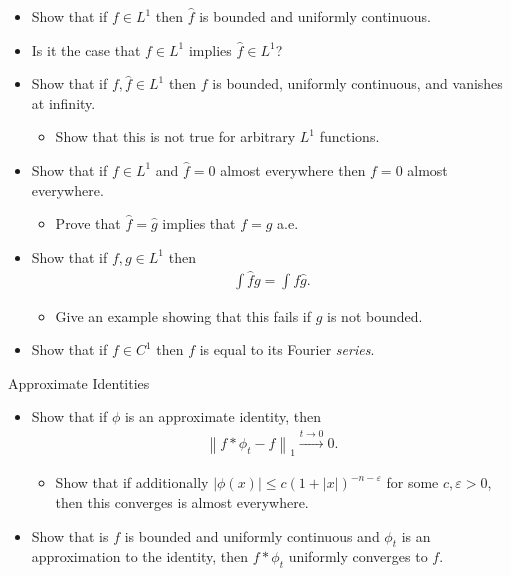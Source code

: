 \begin{itemize}
\tightlist
\item
  Show that if \(f\in L^1\) then \(\widehat{f}\) is bounded and
  uniformly continuous.
\item
  Is it the case that \(f\in L^1\) implies \(\widehat{f}\in L^1\)?
\item
  Show that if \(f, \widehat{f} \in L^1\) then \(f\) is bounded,
  uniformly continuous, and vanishes at infinity.

  \begin{itemize}
  \tightlist
  \item
    Show that this is not true for arbitrary \(L^1\) functions.
  \end{itemize}
\item
  Show that if \(f\in L^1\) and \(\widehat{f} = 0\) almost everywhere
  then \(f = 0\) almost everywhere.

  \begin{itemize}
  \tightlist
  \item
    Prove that \(\widehat{f} = \widehat{g}\) implies that \(f=g\) a.e.
  \end{itemize}
\item
  Show that if \(f, g \in L^1\) then
  \begin{align*}\int \widehat{f} g = \int f\widehat{g}.\end{align*}

  \begin{itemize}
  \tightlist
  \item
    Give an example showing that this fails if \(g\) is not bounded.
  \end{itemize}
\item
  Show that if \(f\in C^1\) then \(f\) is equal to its Fourier
  \emph{series}.
\end{itemize}

Approximate Identities

\begin{itemize}
\tightlist
\item
  Show that if \(\phi\) is an approximate identity, then
  \begin{align*}{\left\lVert {f\ast \phi_t - f} \right\rVert}_1 \overset{t\to 0}\to 0.\end{align*}

  \begin{itemize}
  \tightlist
  \item
    Show that if additionally
    \({\left\lvert {\phi(x)} \right\rvert} \leq c(1 + {\left\lvert {x} \right\rvert})^{-n-\varepsilon}\)
    for some \(c,\varepsilon>0\), then this converges is almost
    everywhere.
  \end{itemize}
\item
  Show that is \(f\) is bounded and uniformly continuous and \(\phi_t\)
  is an approximation to the identity, then \(f\ast \phi_t\) uniformly
  converges to \(f\).
\end{itemize}

